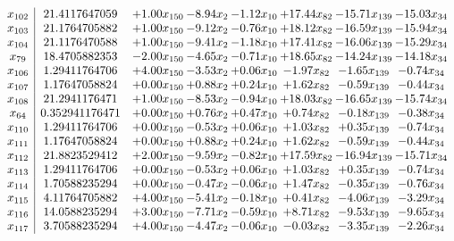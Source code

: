 \documentclass[8pt]{article}
\begin{document}
\[\begin{array}{c| c c@{\hskip 2pt} c@{\hskip 2pt} c@{\hskip 2pt} c@{\hskip 2pt} c@{\hskip 2pt} c@{\hskip 2pt} }
 x_{102}   &  21.4117647059 & +  1.00 x_{150} & -8.94 x_{2} & -1.12 x_{10} & + 17.44 x_{82} & -15.71 x_{139} & -15.03 x_{34}\\
 x_{103}   &  21.1764705882 & +  1.00 x_{150} & -9.12 x_{2} & -0.76 x_{10} & + 18.12 x_{82} & -16.59 x_{139} & -15.94 x_{34}\\
 x_{104}   &  21.1176470588 & +  1.00 x_{150} & -9.41 x_{2} & -1.18 x_{10} & + 17.41 x_{82} & -16.06 x_{139} & -15.29 x_{34}\\
 x_{79}   &  18.4705882353 & -2.00 x_{150} & -4.65 x_{2} & -0.71 x_{10} & + 18.65 x_{82} & -14.24 x_{139} & -14.18 x_{34}\\
 x_{106}   &  1.29411764706 & +  4.00 x_{150} & -3.53 x_{2} & +  0.06 x_{10} & -1.97 x_{82} & -1.65 x_{139} & -0.74 x_{34}\\
 x_{107}   &  1.17647058824 & +  0.00 x_{150} & +  0.88 x_{2} & +  0.24 x_{10} & +  1.62 x_{82} & -0.59 x_{139} & -0.44 x_{34}\\
 x_{108}   &  21.2941176471 & +  1.00 x_{150} & -8.53 x_{2} & -0.94 x_{10} & + 18.03 x_{82} & -16.65 x_{139} & -15.74 x_{34}\\
 x_{64}   &  0.352941176471 & +  0.00 x_{150} & +  0.76 x_{2} & +  0.47 x_{10} & +  0.74 x_{82} & -0.18 x_{139} & -0.38 x_{34}\\
 x_{110}   &  1.29411764706 & +  0.00 x_{150} & -0.53 x_{2} & +  0.06 x_{10} & +  1.03 x_{82} & +  0.35 x_{139} & -0.74 x_{34}\\
 x_{111}   &  1.17647058824 & +  0.00 x_{150} & +  0.88 x_{2} & +  0.24 x_{10} & +  1.62 x_{82} & -0.59 x_{139} & -0.44 x_{34}\\
 x_{112}   &  21.8823529412 & +  2.00 x_{150} & -9.59 x_{2} & -0.82 x_{10} & + 17.59 x_{82} & -16.94 x_{139} & -15.71 x_{34}\\
 x_{113}   &  1.29411764706 & +  0.00 x_{150} & -0.53 x_{2} & +  0.06 x_{10} & +  1.03 x_{82} & +  0.35 x_{139} & -0.74 x_{34}\\
 x_{114}   &  1.70588235294 & +  0.00 x_{150} & -0.47 x_{2} & -0.06 x_{10} & +  1.47 x_{82} & -0.35 x_{139} & -0.76 x_{34}\\
 x_{115}   &  4.11764705882 & +  4.00 x_{150} & -5.41 x_{2} & -0.18 x_{10} & +  0.41 x_{82} & -4.06 x_{139} & -3.29 x_{34}\\
 x_{116}   &  14.0588235294 & +  3.00 x_{150} & -7.71 x_{2} & -0.59 x_{10} & +  8.71 x_{82} & -9.53 x_{139} & -9.65 x_{34}\\
 x_{117}   &  3.70588235294 & +  4.00 x_{150} & -4.47 x_{2} & -0.06 x_{10} & -0.03 x_{82} & -3.35 x_{139} & -2.26 x_{34}\\

\end{array}\]
\end{document}
